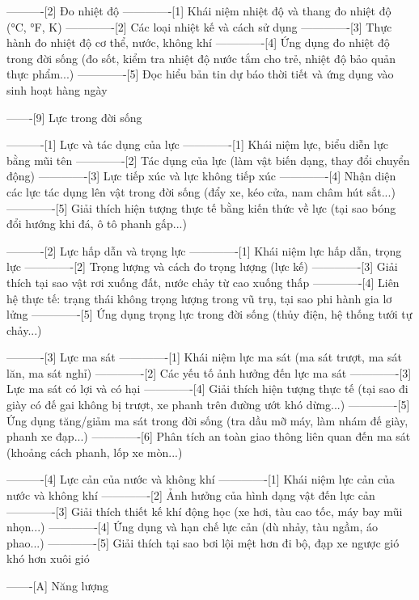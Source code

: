 ----------[2] Đo nhiệt độ
-------------[1] Khái niệm nhiệt độ và thang đo nhiệt độ (°C, °F, K)
-------------[2] Các loại nhiệt kế và cách sử dụng
-------------[3] Thực hành đo nhiệt độ cơ thể, nước, không khí
-------------[4] Ứng dụng đo nhiệt độ trong đời sống (đo sốt, kiểm tra nhiệt độ nước tắm cho trẻ, nhiệt độ bảo quản thực phẩm...)
-------------[5] Đọc hiểu bản tin dự báo thời tiết và ứng dụng vào sinh hoạt hàng ngày

-------[9] Lực trong đời sống

----------[1] Lực và tác dụng của lực
-------------[1] Khái niệm lực, biểu diễn lực bằng mũi tên
-------------[2] Tác dụng của lực (làm vật biến dạng, thay đổi chuyển động)
-------------[3] Lực tiếp xúc và lực không tiếp xúc
-------------[4] Nhận diện các lực tác dụng lên vật trong đời sống (đẩy xe, kéo cửa, nam châm hút sắt...)
-------------[5] Giải thích hiện tượng thực tế bằng kiến thức về lực (tại sao bóng đổi hướng khi đá, ô tô phanh gấp...)

----------[2] Lực hấp dẫn và trọng lực
-------------[1] Khái niệm lực hấp dẫn, trọng lực
-------------[2] Trọng lượng và cách đo trọng lượng (lực kế)
-------------[3] Giải thích tại sao vật rơi xuống đất, nước chảy từ cao xuống thấp
-------------[4] Liên hệ thực tế: trạng thái không trọng lượng trong vũ trụ, tại sao phi hành gia lơ lửng
-------------[5] Ứng dụng trọng lực trong đời sống (thủy điện, hệ thống tưới tự chảy...)

----------[3] Lực ma sát
-------------[1] Khái niệm lực ma sát (ma sát trượt, ma sát lăn, ma sát nghỉ)
-------------[2] Các yếu tố ảnh hưởng đến lực ma sát
-------------[3] Lực ma sát có lợi và có hại
-------------[4] Giải thích hiện tượng thực tế (tại sao đi giày có đế gai không bị trượt, xe phanh trên đường ướt khó dừng...)
-------------[5] Ứng dụng tăng/giảm ma sát trong đời sống (tra dầu mỡ máy, làm nhám đế giày, phanh xe đạp...)
-------------[6] Phân tích an toàn giao thông liên quan đến ma sát (khoảng cách phanh, lốp xe mòn...)

----------[4] Lực cản của nước và không khí
-------------[1] Khái niệm lực cản của nước và không khí
-------------[2] Ảnh hưởng của hình dạng vật đến lực cản
-------------[3] Giải thích thiết kế khí động học (xe hơi, tàu cao tốc, máy bay mũi nhọn...)
-------------[4] Ứng dụng và hạn chế lực cản (dù nhảy, tàu ngầm, áo phao...)
-------------[5] Giải thích tại sao bơi lội mệt hơn đi bộ, đạp xe ngược gió khó hơn xuôi gió

-------[A] Năng lượng

